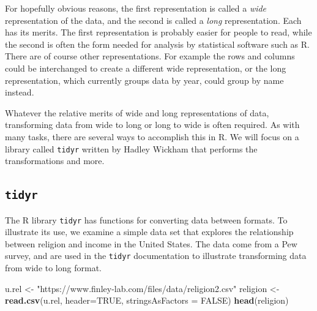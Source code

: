 \documentclass[
]{krantz}
\newenvironment{Shaded}{\begin{snugshade}}{\end{snugshade}}
\newcommand{\DataTypeTok}[1]{\textcolor[rgb]{0.13,0.29,0.53}{#1}}
\newcommand{\KeywordTok}[1]{\textcolor[rgb]{0.13,0.29,0.53}{\textbf{#1}}}
\newcommand{\NormalTok}[1]{#1}
\newcommand{\OtherTok}[1]{\textcolor[rgb]{0.56,0.35,0.01}{#1}}
\newcommand{\StringTok}[1]{\textcolor[rgb]{0.31,0.60,0.02}{#1}}
\begin{document}
For hopefully obvious reasons, the first representation is called a \emph{wide} representation of the data, and the second is called a \emph{long} representation. Each has its merits. The first representation is probably easier for people to read, while the second is often the form needed for analysis by statistical software such as R. There are of course other representations. For example the rows and columns could be interchanged to create a different wide representation, or the long representation, which currently groups data by year, could group by name instead.

Whatever the relative merits of wide and long representations of data, transforming data from wide to long or long to wide is often required. As with many tasks, there are several ways to accomplish this in R. We will focus on a library called \texttt{tidyr} written by Hadley Wickham that performs the transformations and more.

\hypertarget{tidyr}{%
\subsection{\texorpdfstring{\texttt{tidyr}}{tidyr}}\label{tidyr}}

The R library \texttt{tidyr} has functions for converting data between formats. To illustrate its use, we examine a simple data set that explores the relationship between religion and income in the United States. The data come from a Pew survey, and are used in the \texttt{tidyr} documentation to illustrate transforming data from wide to long format.

\begin{Shaded}
\begin{Highlighting}[]
\NormalTok{u.rel \textless{}{-}}\StringTok{ "https://www.finley{-}lab.com/files/data/religion2.csv"}
\NormalTok{religion \textless{}{-}}\StringTok{ }\KeywordTok{read.csv}\NormalTok{(u.rel, }\DataTypeTok{header=}\OtherTok{TRUE}\NormalTok{, }\DataTypeTok{stringsAsFactors =} \OtherTok{FALSE}\NormalTok{)}
\KeywordTok{head}\NormalTok{(religion)}
\end{Highlighting}
\end{Shaded}
\end{document}

